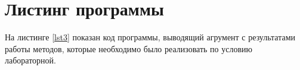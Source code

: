\chapter{Листинг программы}

На листинге \ref{lst3} показан код программы, выводящий агрумент с результатами работы методов, которые необходимо было реализовать по условию лабораторной.

\begin{lstlisting}[caption=код программы, label=lst3]

\end{lstlisting}